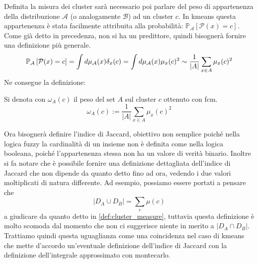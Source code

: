 \noindent Definita la misura dei cluster sarà necessario poi parlare del peso di appartenenza della distribuzione $\mathcal{A}$ (o analogamente $\mathcal{B}$) ad un cluster $c$. In \gls{kmeans} questa appartenenza è stata facilmente attribuita alla probabilità: $\mathbb{P}_\mathcal{A}\left[\mathcal{P}(x)=c\right]$. Come già detto in precedenza, non si ha un predittore, quindi bisognerà fornire una definizione più generale.
\begin{equation*}
	\mathbb{P}_\mathcal{A}\left[\mathcal{P}(x)=c\right] = \int d\mu_\mathcal{A}(x) \delta_x(c) = \int d\mu_\mathcal{A}(x) \mu_x(c)^2 \sim \frac{1}{|A|}\sum_{x\in A} \mu_x(c)^2\\
\end{equation*}
Ne consegue la definizione:
\begin{definition}
\label{def:weightovercluster}
	Si denota con $\omega_A(c)$ il peso del set $A$ sul cluster $c$ ottenuto con \gls{fcm}.
	\begin{equation}
		\omega_A(c) := \frac{1}{|A|}\sum_{x\in A} \mu_x(c)^2
	\end{equation}
\end{definition}

\noindent Ora bisognerà definire l'indice di Jaccard, obiettivo non semplice poiché nella logica fuzzy la cardinalità di un insieme non è definita come nella logica booleana, poiché l'appartenenza stessa non ha un valore di verità binario. Inoltre si fa notare che è possibile fornire una definizione dettagliata dell'indice di Jaccard che non dipende da quanto detto fino ad ora, vedendo i due valori moltiplicati di natura differente. Ad esempio, possiamo essere portati a pensare che
\[
|D_A \cup D_B| = \sum_c \mu(c)
\]
a giudicare da quanto detto in \cref{def:cluster_measure}, tuttavia questa definizione è molto scomoda dal momento che non ci suggerisce niente in merito a $|D_A \cap D_B|$. Trattiamo quindi questa uguaglianza come una coincidenza nel caso di \gls{kmeans} che mette d'accordo un'eventuale definizione dell'indice di Jaccard con la definizione dell'integrale approssimato con \gls{montecarlo}.

